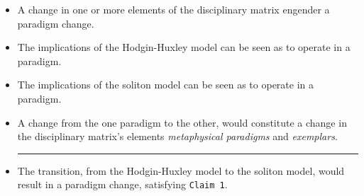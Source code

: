 \vspace{0.5cm}

\begin{itemize}
    \item A change in one or more elements of the disciplinary matrix engender a paradigm change.
    
    
    \item The implications of the Hodgin-Huxley model can be seen as to operate in a paradigm.
    
    
    \item The implications of the soliton model can be seen as to operate in a paradigm.
    
    
    \item A change from the one paradigm to the other, would constitute a change in the disciplinary matrix's elements \textit{metaphysical paradigms} and \textit{exemplars}.\\
    \noindent\rule{\linewidth}{0.5pt}
    
    \item The transition, from the Hodgin-Huxley model to the soliton model, would result in a paradigm change, satisfying \texttt{Claim 1}.
\end{itemize}
\vspace{1cm}